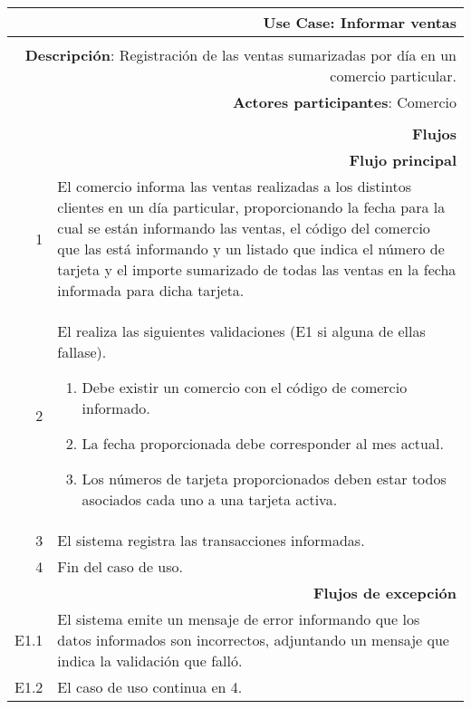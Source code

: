 \begin{tabularx}{\textwidth}{| r | X |}
\hline
\multicolumn{2}{|X|}{
\textbf{Use Case}: Informar ventas} \\

\hline
\multicolumn{2}{|c|}{\cellcolor[gray]{0.6}} \\

\hline
\multicolumn{2}{|X|}{
\textbf{Descripción}: Registración de las ventas sumarizadas por día en un
comercio particular.} \\

\hline
\multicolumn{2}{|X|}{
\textbf{Actores participantes}: Comercio} \\

\hline
\multicolumn{2}{|c|}{\cellcolor[gray]{0.6} } \\

\hline
\multicolumn{2}{|X|}{
\textbf{Flujos}} \\

\hline
\multicolumn{2}{|X|}{
\textbf{Flujo principal}} \\

\hline
1 & El comercio informa las ventas realizadas a los distintos clientes en un
día particular, proporcionando la fecha para la cual se están informando las
ventas, el código del comercio que las está informando y un listado que indica
el número de tarjeta y el importe sumarizado de todas las ventas en la fecha
informada para dicha tarjeta.\\
\hline
2 & El realiza las siguientes validaciones (E1 si alguna de ellas fallase). 
\begin{enumerate}
\item Debe existir un comercio con el código de comercio informado.
\item La fecha proporcionada debe corresponder al mes actual.
\item Los números de tarjeta proporcionados deben estar todos asociados cada
uno a una tarjeta activa.
\end{enumerate}
\\
\hline
3 & El sistema registra las transacciones informadas. \\
\hline
4 & Fin del caso de uso. \\

\hline
\multicolumn{2}{|X|}{
\textbf{Flujos de excepción}} \\

\hline
E1.1 & El sistema emite un mensaje de error informando que los datos informados
son incorrectos, adjuntando un mensaje que indica la validación que falló. \\
\hline
E1.2 & El caso de uso continua en 4. \\

\hline
\end{tabularx}

